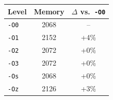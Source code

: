 \begin{tabular*}{\columnwidth}{@{\extracolsep\fill}lcc@{\extracolsep\fill}}
\toprule
\textbf{Level} & \textbf{Memory} & \textbf{$\Delta$ vs.\ \texttt{-O0}} \\
\midrule
\texttt{-O0} & 2068 & -- \\
\texttt{-O1} & 2152 & +4\% \\
\texttt{-O2} & 2072 & +0\% \\
\texttt{-O3} & 2072 & +0\% \\
\texttt{-Os} & 2068 & +0\% \\
\texttt{-Oz} & 2126 & +3\% \\
\bottomrule
\end{tabular*}
